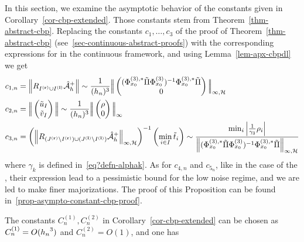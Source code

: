 In this section, we examine the asymptotic behavior of the constants given in Corollary~\ref{cor-cbp-extended}. Those constants stem from Theorem~\ref{thm-abstract-cbp}.%
Replacing the constants $c_1,\ldots, c_3$ of the proof of Theorem~\ref{thm-abstract-cbp} (see~\ref{sec-continuous-abstract-proofs}) with the corresponding expressions for in the continuous framework, and using Lemma~\ref{lem-apx-cbpdl} we get
\begin{align}\label{eq-cbp-cst-asympt-1}
	c_{1,n}&= \left\lVert R_{{I^{\mathbf{(r)}}}\cup{I^{\mathbf{(l)}}}}{\hat{\mathcal{A}}_h}^+ \right\rVert  
	\sim 
	\frac{1}{({h_n})^3}\Big|\!\Big| \begin{pmatrix}
    (\Phi_{x_0}^{(3),*}\tilde{\Pi} \Phi_{x_0}^{(3)})^{-1}\Phi_{x_0}^{(3),*}\tilde{\Pi} \\
    0
  \end{pmatrix} \Big |\!\Big|_{\infty,\mathcal{H}}\\
  	\label{eq-cbp-cst-asympt-2}
  	c_{2,n}&= 
	\Big|\!\Big| \begin{pmatrix} \tilde{u}_I\\\tilde{v}_I \end{pmatrix} \Big |\!\Big|
	\sim 
	\frac{1}{({h_n})^3} 
	\Big|\!\Big| 
		\begin{pmatrix}\rho \\ 0 \end{pmatrix}
	 \Big |\!\Big|_{\infty}\\
	\label{eq-cbp-cst-asympt-3}
  	c_{3,n} &= 
  	\left(\left\lVert R_{({J^{\mathbf{(r)}}}\setminus{I^{\mathbf{(r)}}})\cup({J^{\mathbf{(l)}}}\setminus{I^{\mathbf{(l)}}})}{\hat{\mathcal{A}}_h}^+ \right\rVert_{\infty,\mathcal{H}}\right)^{-1}
	\left(\min_{i\in I}\tilde{t}_i\right)
		\sim 
		\frac{
			\min_i \left| \frac{1}{\gamma_3} \rho_i \right|  
		}{
			\left\lVert (\Phi_{x_0}^{(3),*}\tilde{\Pi} \Phi_{x_0}^{(3)})^{-1}\Phi_{x_0}^{(3),*}\tilde{\Pi} \right\rVert_{\infty,\mathcal{H}}
		}
\end{align}
where $\gamma_k$ is defined in~\eqref{eq?defn-alphak}.
As for $c_{4,n}$ and $c_{5_n}$, like in the case of the \lasso, their expression lead to a pessimistic bound for the low noise regime, and we are led to make finer majorizations. The proof of this Proposition can be found in~\ref{prop-asympto-constant-cbp-proof}.

\begin{prop}\label{prop-asympto-constant-cbp}
  The constants $C^{(1)}_n, C^{(2)}_n$ in Corollary~\ref{cor-cbp-extended} can be chosen as $C^{(1)}_n=O({h_n}^3)$ and $C^{(2)}_n=O(1)$, and one has
\end{prop}

\fi
